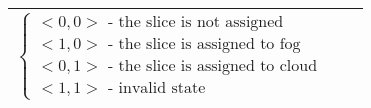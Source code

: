 \begin{table}[!ht]
\begin{tabular}{| l | l | l |}
                $\begin{cases}
                    <0, 0> \text{ - the slice is not assigned}
                    \\
                    <1, 0> \text{ - the slice is assigned to fog}
                    \\
                    <0, 1> \text{ - the slice is assigned to cloud}
                    \\
                    <1, 1> \text{ - invalid state}
                \end{cases}$\\
            \hline   
        \end{tabular}
        \label{tab:statements2}
        \end{table}